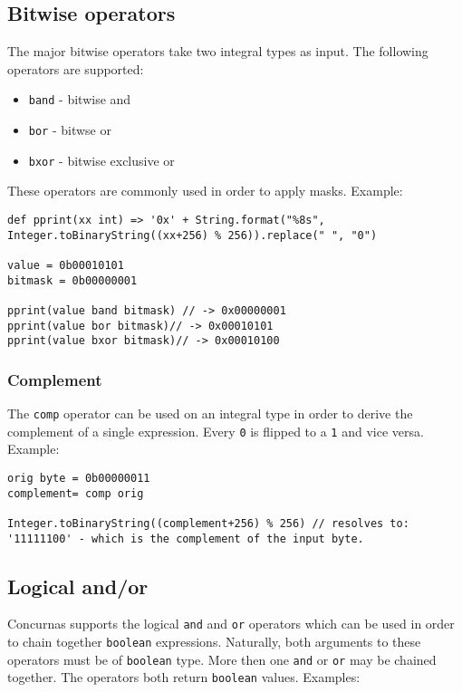 \documentclass[conc-doc]{subfiles}
\begin{document}
\subsection{Bitwise operators}
The major bitwise operators take two integral types as input. The following operators are supported:
\begin{itemize}
	\item \lstinline{band} - bitwise and
	\item \lstinline{bor} - bitwse or
	\item \lstinline{bxor} - bitwise exclusive or
\end{itemize}

These operators are commonly used in order to apply masks. Example:

\begin{lstlisting}
def pprint(xx int) => '0x' + String.format("%8s", Integer.toBinaryString((xx+256) % 256)).replace(" ", "0")

value = 0b00010101
bitmask = 0b00000001

pprint(value band bitmask) // -> 0x00000001
pprint(value bor bitmask)// -> 0x00010101
pprint(value bxor bitmask)// -> 0x00010100
\end{lstlisting}

\subsubsection{Complement}
The \lstinline{comp} operator can be used on an integral type in order to derive the complement of a single expression. Every \lstinline{0} is flipped to a \lstinline{1} and vice versa. Example:

\begin{lstlisting}
orig byte = 0b00000011
complement= comp orig

Integer.toBinaryString((complement+256) % 256) // resolves to: '11111100' - which is the complement of the input byte.
\end{lstlisting}

\subsection{Logical and/or}
Concurnas supports the logical \lstinline{and} and \lstinline{or} operators which can be used in order to chain together \lstinline{boolean} expressions. Naturally, both arguments to these operators must be of \lstinline{boolean} type. More then one \lstinline{and} or \lstinline{or} may be chained together. The operators both return \lstinline{boolean} values. Examples:
\end{document}
